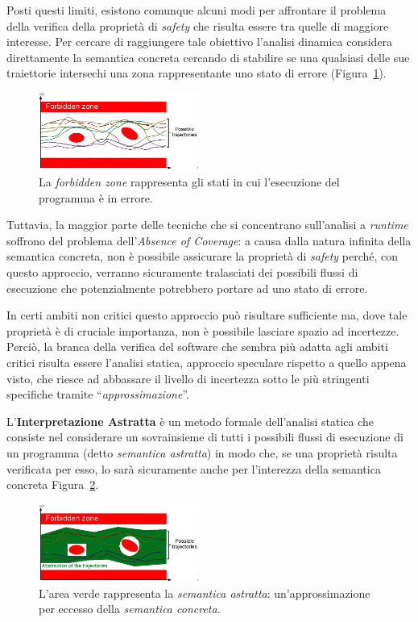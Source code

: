 Posti questi limiti, esistono comunque alcuni modi per affrontare il problema della verifica della proprietà di \textit{safety} che risulta essere tra quelle di maggiore interesse.
Per cercare di raggiungere tale obiettivo l'analisi dinamica considera direttamente la semantica concreta cercando di stabilire se una qualsiasi delle sue traiettorie intersechi una zona rappresentante uno stato di errore (Figura~\ref{fig:forbidden_zone}).
\begin{figure}[ht]
    \centering
    \includegraphics[width=0.47\textwidth]{figures/forbidden_zone.png}
    \caption{La \textit{forbidden zone} rappresenta gli stati in cui l'esecuzione del programma è in errore.}
    \label{fig:forbidden_zone}
\end{figure}

Tuttavia, la maggior parte delle tecniche che si concentrano sull'analisi a \textit{runtime} soffrono del problema dell'\textit{Absence of Coverage}: a causa dalla natura infinita della semantica concreta, non è possibile assicurare la proprietà di \textit{safety} perché, con questo approccio, verranno sicuramente tralasciati dei possibili flussi di esecuzione che potenzialmente potrebbero portare ad uno stato di errore.

In certi ambiti non critici questo approccio può risultare sufficiente ma, dove tale proprietà è di cruciale importanza, non è possibile lasciare spazio ad incertezze.
Perciò, la branca della verifica del software che sembra più adatta agli ambiti critici risulta essere l'analisi statica, approccio speculare rispetto a quello appena visto, che riesce ad abbassare il livello di incertezza sotto le più stringenti specifiche tramite ``\textit{approssimazione}''.

L'\textbf{Interpretazione Astratta} \cite{AbsIntNutshell} è un metodo formale dell'analisi statica che consiste nel considerare un sovrainsieme di tutti i possibili flussi di esecuzione di un programma (detto \textit{semantica astratta}) in modo che, se una proprietà risulta verificata per esso, lo sarà sicuramente anche per l'interezza della semantica concreta Figura~\ref{fig:semantica_astratta}.

\begin{figure}[ht]
    \centering
    \includegraphics[width=0.47\textwidth]{figures/semantica_astratta.png}
    \caption{L'area verde rappresenta la \textit{semantica astratta}: un'approssimazione per eccesso della \textit{semantica concreta}.}
    \label{fig:semantica_astratta}
\end{figure}

